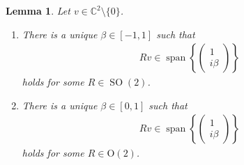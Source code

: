 \documentclass{amsart}
\newtheorem{lemma}[thm]{Lemma}
\newcommand{\C}{\mathbb{C}}
\DeclareMathOperator{\SO}{SO}
\DeclareMathOperator{\spann}{span}
\begin{document}
\begin{lemma}
    \label{lin::lemma:lines_in_C2_via_Möbius_trafo}
    Let $v \in \C^2 \setminus \{0\}$.
    \begin{enumerate}
        \item There is a unique $\beta \in [-1, 1]$ such that
        \begin{align*}
            Rv \in \spann\left\{ \begin{pmatrix}
                1 \\ i \beta
            \end{pmatrix}\right\}
        \end{align*}
        holds for some $R \in \SO(2)$.
        \item There is a unique $\beta \in [0,1]$ such that
        \begin{align*}
            Rv \in \spann\left\{ \begin{pmatrix}
                1 \\ i \beta
            \end{pmatrix}\right\}
        \end{align*}
        holds for some $R \in \mathrm{O}(2)$.
    \end{enumerate}
\end{lemma}
\end{document}
